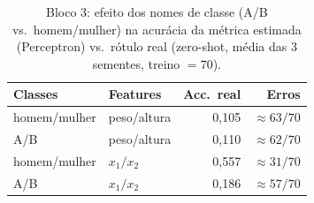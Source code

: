 \documentclass[12pt,a4paper]{article}
\providecommand{\DIFaddbegin}{} %
\providecommand{\DIFaddend}{} %
\providecommand{\DIFdelbegin}{} %
\providecommand{\DIFdelend}{} %
\providecommand{\DIFscaledelfig}{0.5}
\newlength{\DIFdelgraphicswidth} %
\newlength{\DIFdelgraphicsheight} %
\providecommand{\DIFaddincludegraphics}[2][]{{\color{blue}\fbox{\DIFOincludegraphics[#1]{#2}}}} %
\providecommand{\DIFdelincludegraphics}[2][]{%
\sbox{\DIFdelgraphicsbox}{\DIFOincludegraphics[#1]{#2}}%
\settoboxwidth{\DIFdelgraphicswidth}{\DIFdelgraphicsbox} %
\settoboxtotalheight{\DIFdelgraphicsheight}{\DIFdelgraphicsbox} %
\scalebox{\DIFscaledelfig}{%
\parbox[b]{\DIFdelgraphicswidth}{\usebox{\DIFdelgraphicsbox}\\[-\baselineskip] \rule{\DIFdelgraphicswidth}{0em}}\llap{\resizebox{\DIFdelgraphicswidth}{\DIFdelgraphicsheight}{%
\setlength{\unitlength}{\DIFdelgraphicswidth}%
\begin{picture}(1,1)%
\thicklines\linethickness{2pt} %
{\color[rgb]{1,0,0}\put(0,0){\framebox(1,1){}}}%
{\color[rgb]{1,0,0}\put(0,0){\line( 1,1){1}}}%
{\color[rgb]{1,0,0}\put(0,1){\line(1,-1){1}}}%
\end{picture}%
}\hspace*{3pt}}} %
} %
\DeclareRobustCommand{\DIFaddbegin}{\DIFOaddbegin \let\includegraphics\DIFaddincludegraphics} %
\DeclareRobustCommand{\DIFaddend}{\DIFOaddend \let\includegraphics\DIFOincludegraphics} %
\DeclareRobustCommand{\DIFdelbegin}{\DIFOdelbegin \let\includegraphics\DIFdelincludegraphics} %
\DeclareRobustCommand{\DIFdelend}{\DIFOaddend \let\includegraphics\DIFOincludegraphics} %
\begin{document}
\DIFdelbegin %
\DIFdelend \DIFaddbegin \begin{table}[ht]
\centering
\caption{Bloco 3: efeito dos nomes de classe (A/B vs.\ homem/mulher) na acurácia da
métrica estimada (Perceptron) vs.\ rótulo real (zero-shot, média das $3$ sementes,
treino $=70$).}
\label{tab:real_ab}
\begin{tabular}{llrr}
\toprule
\textbf{Classes} & \textbf{Features} & \textbf{Acc.\ real} & \textbf{Erros} \\
\midrule
homem/mulher & peso/altura & 0,105 & $\approx 63/70$ \\
A/B          & peso/altura & 0,110 & $\approx 62/70$ \\
homem/mulher & $x_1/x_2$   & 0,557 & $\approx 31/70$ \\
A/B          & $x_1/x_2$   & 0,186 & $\approx 57/70$ \\
\bottomrule
\end{tabular}
\end{table}
\DIFaddend 
\end{document}
